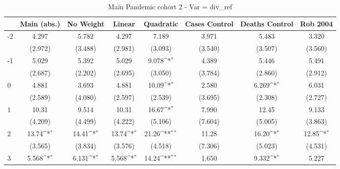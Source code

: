 \documentclass{article}
\begin{document}
{
\def\sym#1{\ifmmode^{#1}\else\(^{#1}\)\fi}
\begin{longtable}{l*{7}{c}}
\caption{Main Pandemic cohort 2 - Var = div\_ref}\\
\hline\hline\endfirsthead\hline\endhead\hline\endfoot\endlastfoot
                &\multicolumn{1}{c}{Main (abs.)}&\multicolumn{1}{c}{No Weight}&\multicolumn{1}{c}{Linear}&\multicolumn{1}{c}{Quadratic}&\multicolumn{1}{c}{Cases Control}&\multicolumn{1}{c}{Deaths Control}&\multicolumn{1}{c}{Rob 2004}\\
\hline
-2              &    4.297         &    5.782         &    4.297         &    7.189         &    3.971         &    5.483         &    3.320         \\
                &  (2.972)         &  (3.488)         &  (2.981)         &  (3.093)         &  (3.540)         &  (3.507)         &  (3.560)         \\
-1              &    5.029         &    5.392         &    5.029         &    9.078\sym{*}  &    4.389         &    5.446         &    5.491         \\
                &  (2.687)         &  (2.202)         &  (2.695)         &  (3.050)         &  (3.784)         &  (2.860)         &  (2.912)         \\
0               &    4.881         &    3.693         &    4.881         &    10.09\sym{*}  &    2.580         &    6.269\sym{*}  &    6.031         \\
                &  (2.589)         &  (4.080)         &  (2.597)         &  (2.539)         &  (3.695)         &  (2.308)         &  (2.727)         \\
1               &    10.31         &    9.514         &    10.31         &    16.67\sym{*}  &    7.990         &    12.45         &    9.133         \\
                &  (4.209)         &  (4.499)         &  (4.222)         &  (5.106)         &  (7.604)         &  (5.005)         &  (3.863)         \\
2               &    13.74\sym{*}  &    14.41\sym{*}  &    13.74\sym{*}  &    21.26\sym{**} &    11.28         &    16.20\sym{*}  &    12.85\sym{*}  \\
                &  (3.565)         &  (3.834)         &  (3.576)         &  (4.518)         &  (7.306)         &  (5.023)         &  (4.531)         \\
3               &    5.568\sym{*}  &    6.131\sym{*}  &    5.568\sym{*}  &    14.24\sym{**} &    1.650         &    9.332\sym{*}  &    5.227         \\

\end{longtable}}
\end{document}
